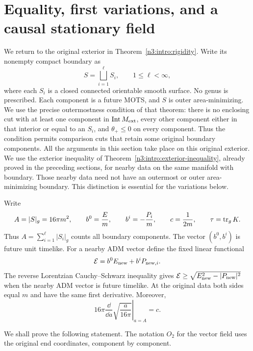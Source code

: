 \section{Equality, first variations, and a causal stationary field}
\label{n3:variation:section}

We return to the original exterior in Theorem~\ref{n3:intro:rigidity}.
Write its nonempty compact boundary as
\[
 S=\bigsqcup_{i=1}^{\ell}S_i,\qquad 1\leq\ell<\infty,
\]
where each $S_i$ is a closed connected orientable smooth surface.
No genus is prescribed.  Each component is a future MOTS, and $S$
is outer area-minimizing.  We use the precise outermostness condition
of that theorem: there is no enclosing cut with at least one component
in $\operatorname{Int}M_{\mathrm{ext}}$, every other component either in that
interior or equal to an $S_i$, and $\theta_+\leq0$ on every component.
Thus the condition permits comparison cuts that retain some original
boundary components.  All the arguments in this section
take place on this original exterior.  We use the exterior inequality
of Theorem~\ref{n3:intro:exterior-inequality}, already proved in the
preceding sections, for nearby data on the same manifold with boundary.
Those nearby data need not have an outermost or outer area-minimizing
boundary.  This distinction is essential for the variations below.

Write
\[
 A=|S|_g=16\pi m^2,\qquad
 b^0=\frac Em,\qquad b^i=-\frac{P_i}{m},\qquad
 c=\frac1{2m},\qquad \tau=\operatorname{tr}_g K.
\]
Thus $A=\sum_{i=1}^{\ell}|S_i|_g$ counts all boundary components.
The vector $(b^0,b^i)$ is future unit timelike.  For a nearby ADM
vector define the fixed linear functional
\begin{equation}
 \mathcal E=b^0E_{\rm new}+b^iP_{{\rm new},i}.
 \label{n3:variation:supporting-energy}
\end{equation}
The reverse Lorentzian Cauchy--Schwarz inequality gives
$\mathcal E\ge\sqrt{E_{\rm new}^2-|P_{\rm new}|^2}$ when the
nearby ADM vector is future timelike.  At the original data both sides
equal $m$ and have the same first derivative.  Moreover,
\begin{equation}
 \left.16\pi\frac{\dd}{\dd a}\sqrt{\frac a{16\pi}}
 \right|_{a=A}=c.
 \label{n3:variation:area-coefficient}
\end{equation}

We shall prove the following statement.  The notation $O_2$ for the
vector field uses the original end coordinates, component by component.

